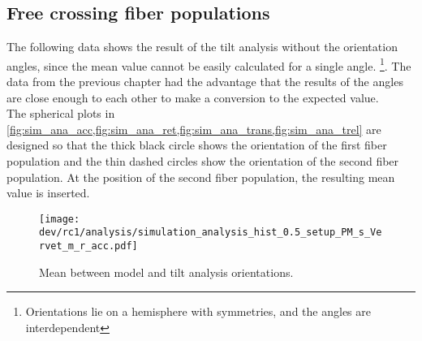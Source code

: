 \subsection{Free crossing fiber populations}
\label{sec:resFreeCross}
%
The following data shows the result of the tilt analysis without the orientation angles, since the mean value cannot be easily calculated for a single angle. \footnote{Orientations lie on a hemisphere with symmetries, and the angles are interdependent}.
The data from the previous chapter had the advantage that the results of the angles are close enough to each other to make a conversion to the expected value.
\\
%
The spherical plots in \cref{fig:sim_ana_acc,fig:sim_ana_ret,fig:sim_ana_trans,fig:sim_ana_trel} are designed so that the thick black circle shows the orientation of the first fiber population and the thin dashed circles show the orientation of the second fiber population.
At the position of the second fiber population, the resulting mean value is inserted.
%
%
%
\begin{figure}[!p]
\centering
\texttt{[image: dev/rc1/analysis/simulation\_analysis\_hist\_0.5\_setup\_PM\_s\_Vervet\_m\_r\_acc.pdf]}
\caption[Simulation acc]{Mean \acc{} between model and tilt analysis orientations.}
\label{fig:sim_ana_acc}
\end{figure}
%

